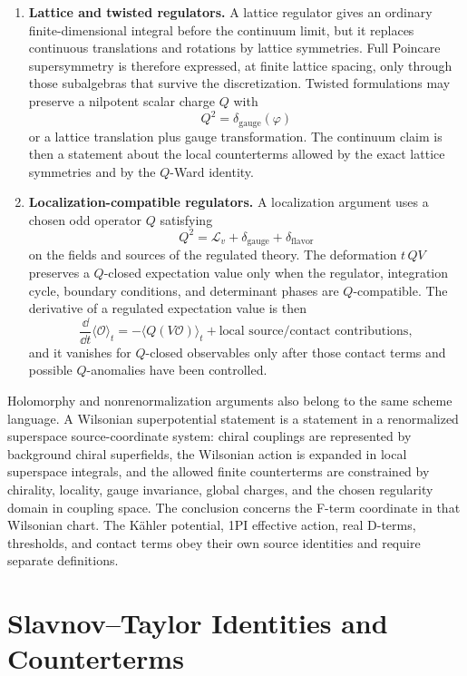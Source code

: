 \begin{enumerate}
breaking must be local and cohomologically removable.  The presence of heavy
auxiliary fields by itself supplies no symmetry statement.
\item \textbf{Lattice and twisted regulators.}  A lattice regulator gives an
ordinary finite-dimensional integral before the continuum limit, but it
replaces continuous translations and rotations by lattice symmetries.  Full
Poincare supersymmetry is therefore expressed, at finite lattice spacing, only
through those subalgebras that survive the discretization.  Twisted
formulations may preserve a nilpotent scalar charge \(Q\) with
\[
  Q^2=\delta_{\mathrm{gauge}}(\varphi)
\]
or a lattice translation plus gauge transformation.  The continuum claim is
then a statement about the local counterterms allowed by the exact lattice
symmetries and by the \(Q\)-Ward identity.
\item \textbf{Localization-compatible regulators.}  A localization argument
uses a chosen odd operator \(Q\) satisfying
\[
  Q^2=\mathcal L_v+\delta_{\mathrm{gauge}}+\delta_{\mathrm{flavor}}
\]
on the fields and sources of the regulated theory.  The deformation
\(t\,Q V\) preserves a \(Q\)-closed expectation value only when the regulator,
integration cycle, boundary conditions, and determinant phases are
\(Q\)-compatible.  The derivative of a regulated expectation value is then
\[
  \frac{\dd}{\dd t}
  \langle\mathcal O\rangle_t
  =
  -\langle Q(V\mathcal O)\rangle_t
  +\text{local source/contact contributions},
\]
and it vanishes for \(Q\)-closed observables only after those contact terms
and possible \(Q\)-anomalies have been controlled.
\end{enumerate}

Holomorphy and nonrenormalization arguments also belong to the same scheme
language.  A Wilsonian superpotential statement is a statement in a
renormalized superspace source-coordinate system: chiral couplings are represented by
background chiral superfields, the Wilsonian action is expanded in local
superspace integrals, and the allowed finite counterterms are constrained by
chirality, locality, gauge invariance, global charges, and the chosen
regularity domain in coupling space.  The conclusion concerns the F-term
coordinate in that Wilsonian chart.  The K\"ahler potential, 1PI effective
action, real D-terms, thresholds, and contact terms obey their own source
identities and require separate definitions.

\section{Slavnov--Taylor Identities and Counterterms}

